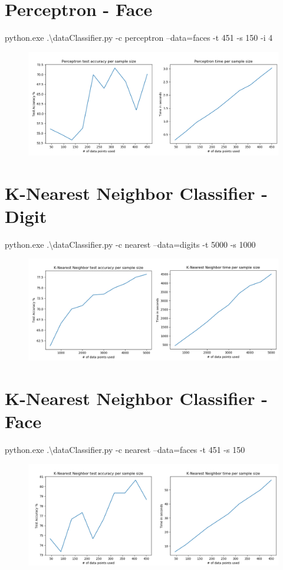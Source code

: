\documentclass[12pt]{article}
\begin{document}
\section*{Perceptron - Face}
python.exe .\textbackslash dataClassifier.py -c perceptron --data=faces -t 451 -s 150 -i 4 \\
\begin{figure}[!htb]
	\centering
	\includegraphics[width=1\textwidth]{perc_f.png}
\end{figure}
\newpage
\section*{K-Nearest Neighbor Classifier - Digit}
python.exe .\textbackslash dataClassifier.py -c nearest --data=digits -t 5000 -s 1000 \\
\begin{figure}[!htb]
	\centering
	\includegraphics[width=1\textwidth]{knn_d.png}
\end{figure}
\section*{K-Nearest Neighbor Classifier - Face}
python.exe .\textbackslash dataClassifier.py -c nearest --data=faces -t 451 -s 150 \\
\begin{figure}[!htb]
	\centering
	\includegraphics[width=1\textwidth]{knn_f.png}
\end{figure}
\newpage


\end{document}
